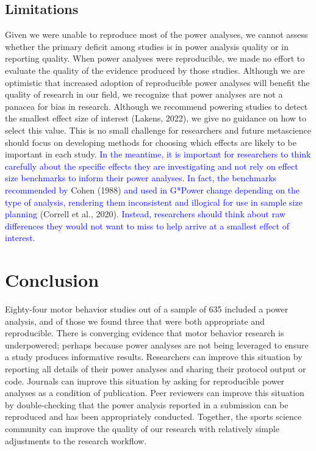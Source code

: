 \documentclass[
  man, donotrepeattitle,mask,floatsintext]{apa7}
\begin{document}
\newpage

\hypertarget{limitations}{%
\subsection{Limitations}\label{limitations}}

Given we were unable to reproduce most of the power analyses, we cannot assess whether the primary deficit among studies is in power analysis quality or in reporting quality. When power analyses were reproducible, we made no effort to evaluate the quality of the evidence produced by those studies. Although we are optimistic that increased adoption of reproducible power analyses will benefit the quality of research in our field, we recognize that power analyses are not a panacea for bias in research. Although we recommend powering studies to detect the smallest effect size of interest (Lakens, 2022), we give no guidance on how to select this value. This is no small challenge for researchers and future metascience should focus on developing methods for choosing which effects are likely to be important in each study. \textcolor{blue}{In the meantime, it is important for researchers to think carefully about the specific effects they are investigating and not rely on effect size benchmarks to inform their power analyses. In fact, the benchmarks recommended by} Cohen (1988) \textcolor{blue}{and used in G*Power change depending on the type of analysis, rendering them inconsistent and illogical for use in sample size planning} (Correll et al., 2020). \textcolor{blue}{Instead, researchers should think about raw differences they would not want to miss to help arrive at a smallest effect of interest.}

\hypertarget{conclusion}{%
\section{Conclusion}\label{conclusion}}

Eighty-four motor behavior studies out of a sample of 635 included a power analysis, and of those we found three that were both appropriate and reproducible. There is converging evidence that motor behavior research is underpowered; perhaps because power analyses are not being leveraged to ensure a study produces informative results. Researchers can improve this situation by reporting all details of their power analyses and sharing their protocol output or code. Journals can improve this situation by asking for reproducible power analyses as a condition of publication. Peer reviewers can improve this situation by double-checking that the power analysis reported in a submission can be reproduced and has been appropriately conducted. Together, the sports science community can improve the quality of our research with relatively simple adjustments to the research workflow.
\end{document}
